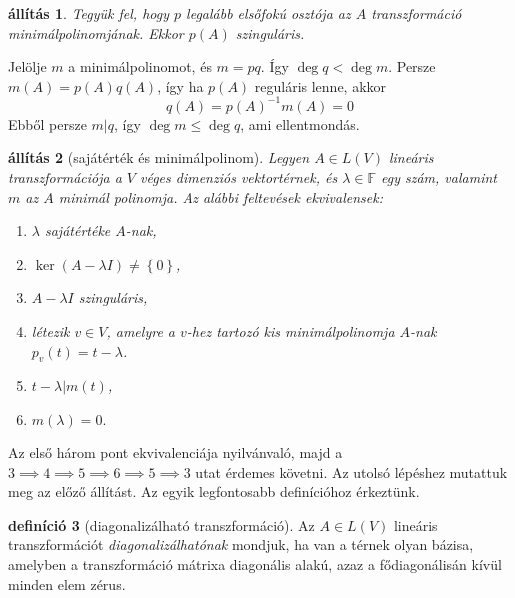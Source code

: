 \documentclass[9pt, a4paper, showtrims]{memoir}
\makeatletter
\renewenvironment{proof}[1][\proofname]
    {\par\pushQED{\qed}%
    \normalfont \topsep6\p@\@plus6\p@\relax
    \trivlist
    \item[\hskip\labelsep
        \itshape
    #1\@addpunct{:}]\ignorespaces}
    {\popQED\endtrivlist\@endpefalse}
\theoremstyle{plain}
\newtheorem{proposition}{állítás}[chapter]
\theoremstyle{remark}
\theoremstyle{definition}
\newtheorem{definition}[proposition]{definíció}
\makeatother
\begin{document}
    \begin{proposition}
        Tegyük fel, hogy $p$ legalább elsőfokú osztója az $A$ transzformáció minimálpolinomjának.
        Ekkor $p\left( A \right)$ szinguláris.
    \end{proposition}
    \begin{proof}
        Jelölje $m$ a minimálpolinomot,
        és $m=pq$.
        Így $\deg q<\deg m$. Persze $m\left( A \right)=p\left( A \right)q\left( A \right)$,
        így ha $p\left( A \right)$ reguláris lenne,
        akkor 
        \[
            q\left( A \right)=p\left( A \right)^{-1}m\left( A \right)=0
        \]
        Ebből persze $m|q$, így $\deg m\leq \deg q$, ami ellentmondás.
    \end{proof}
    \begin{proposition}[sajátérték és minimálpolinom]
        Legyen $A\in L\left( V \right)$ lineáris transzformációja a $V$ véges dimenziós 
        vektortérnek, és $\lambda\in\mathbb{F}$ egy szám, valamint $m$ az $A$ minimál
        polinomja.
        Az alábbi feltevések ekvivalensek:
        \begin{enumerate}
            \item $\lambda$ sajátértéke $A$-nak,
            \item $\ker (A-\lambda I)\neq \left\{ 0 \right\}$,
            \item $A-\lambda I$ szinguláris,
            \item létezik $v\in V$, 
                amelyre a $v$-hez tartozó kis minimálpolinomja $A$-nak $p_v(t)=t-\lambda$.
            \item $t-\lambda|m\left( t \right)$,
            \item $m\left( \lambda \right)=0.$\qedhere
        \end{enumerate}
    \end{proposition}
    \begin{proof}
        Az első három pont ekvivalenciája nyilvánvaló,
        majd a $3\implies 4\implies 5\implies 6\implies 5\implies 3$
        utat érdemes követni.
        Az utolsó lépéshez mutattuk meg az előző állítást.
    \end{proof}
    Az egyik legfontosabb definícióhoz érkeztünk.
    \begin{definition}[diagonalizálható transzformáció]
        Az $A\in L\left( V \right)$ lineáris transzformációt \emph{diagonalizálhatónak}
        mondjuk, 
        ha van a térnek olyan bázisa,
        amelyben a transzformáció mátrixa diagonális alakú,
        azaz a fődiagonálisán kívül minden elem zérus.
    \end{definition}
\end{document}
